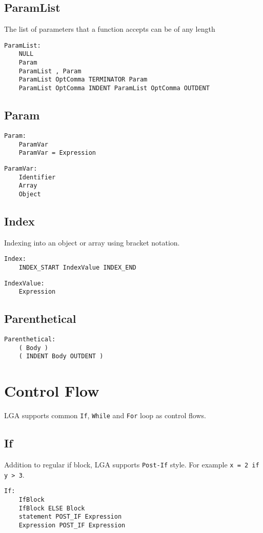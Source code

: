 \documentclass[10pt]{report}
\begin{document}
\subsection{ParamList}
The list of parameters that a function accepts can be of any length
\begin{verbatim}
ParamList:
    NULL
    Param
    ParamList , Param
    ParamList OptComma TERMINATOR Param
    ParamList OptComma INDENT ParamList OptComma OUTDENT
\end{verbatim}

\subsection{Param}
\begin{verbatim}
Param:
    ParamVar
    ParamVar = Expression
\end{verbatim}

\begin{verbatim}
ParamVar:
    Identifier
    Array
    Object
\end{verbatim}

\subsection{Index}
Indexing into an object or array using bracket notation.
\begin{verbatim}
Index:
    INDEX_START IndexValue INDEX_END
\end{verbatim}

\begin{verbatim}
IndexValue:
    Expression
\end{verbatim}


\subsection{Parenthetical}

\begin{verbatim}
Parenthetical:
    ( Body )
    ( INDENT Body OUTDENT )
\end{verbatim}

\section{Control Flow}

LGA supports common \texttt{If}, \texttt{While} and \texttt{For} loop as control flows.


\subsection{If}
Addition to regular if block, LGA supports \texttt{Post-If} style. For example \texttt{x = 2 if y > 3}.
\begin{verbatim}
If:
    IfBlock
    IfBlock ELSE Block
    statement POST_IF Expression
    Expression POST_IF Expression
\end{verbatim}
\end{document}
